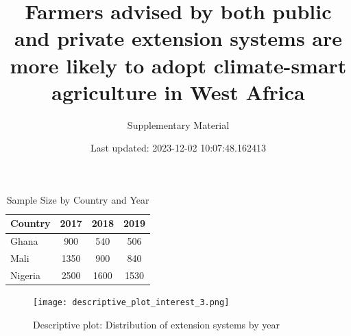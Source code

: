 \documentclass[
]{article}
\title{Farmers advised by both public and private extension systems are more likely to adopt climate-smart agriculture in West Africa}
\subtitle{Supplementary Material}
\date{Last updated: 2023-12-02 10:07:48.162413}
\begin{document}
\maketitle

\newpage

\newpage
\listoftables
\listoffigures
\newpage

\begin{table}[ht]
\centering
\caption{Sample Size by Country and Year}
\begin{tabular}{@{}lccc@{}}
\toprule
Country & 2017 & 2018 & 2019 \\ 
\midrule
Ghana   &  900 &  540 &  506 \\
Mali    & 1350 &  900 &  840 \\
Nigeria & 2500 & 1600 & 1530 \\
\bottomrule
\end{tabular}

\label{tab:sample_size}
\end{table}

\begin{figure}[!htb]
  \centering

      \texttt{[image: descriptive\_plot\_interest\_3.png]}
  \caption{Descriptive plot: Distribution of extension systems by year}
\end{figure}

\clearpage
\end{document}
